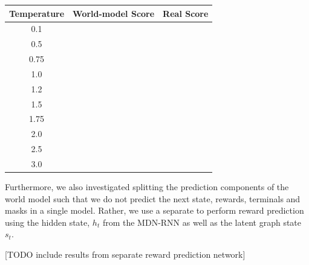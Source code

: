 \begin{table}[]
  \centering
  \begin{tabular}{@{}cll@{}}
  \toprule
  Temperature & \multicolumn{1}{c}{World-model Score} & \multicolumn{1}{c}{Real Score} \\ \midrule
  0.1         & \multicolumn{1}{c}{}                  & \multicolumn{1}{c}{}           \\
  0.5         & \multicolumn{1}{c}{}                  & \multicolumn{1}{c}{}           \\
  0.75        &                                       &                                \\
  1.0         &                                       &                                \\
  1.2         &                                       &                                \\
  1.5         &                                       &                                \\
  1.75        &                                       &                                \\
  2.0         &                                       &                                \\
  2.5         &                                       &                                \\
  3.0         &                                       &                                \\ \bottomrule
  \end{tabular}
  \end{table}

Furthermore, we also investigated splitting the prediction components of the world model such that we do not predict the next state, rewards, terminals and masks in a single model. Rather, we use a separate to perform reward prediction using the hidden state, $h_t$ from the MDN-RNN as well as the latent graph state $s_t$.

[TODO include results from separate reward prediction network]

